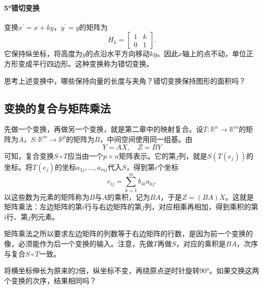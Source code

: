\paragraph{5°错切变换} \mbox{}

变换\(x^{\prime} = x + k y\)，\(y^{\prime} = y\)的矩阵为
\begin{equation}
    H_{k} = \left[ \begin{matrix}1 & k \\ 0 & 1\end{matrix} \right] .
\end{equation}
它保持纵坐标，将高度为\(y\)的点沿水平方向移动\(k y\)。因此\(x\)轴上的点不动，单位正方形变成平行四边形。这种变换称为错切变换。

{\kaiti{}思考\quad 上述变换中，哪些保持向量的长度与夹角？错切变换保持图形的面积吗？}

\subsection{变换的复合与矩阵乘法}
先做一个变换，再做另一个变换，就是第二章中的映射复合。设\(T : \mathbb{R}^{n} \longrightarrow \mathbb{R}^{m}\)的矩阵为\(A\)，\(S : \mathbb{R}^{m} \longrightarrow \mathbb{R}^{p}\)的矩阵为\(B\)，中间空间使用同一组基。由
\begin{equation}
    Y = A X , \quad Z = B Y
\end{equation}
可知，复合变换\(S \circ T\)应当由一个\(p \times n\)矩阵表示。它的第\(j\)列，就是\(S \left( T \left( e_{j} \right) \right)\)的坐标。将\(T \left( e_{j} \right)\)的坐标\(a_{1 j} , \ldots , a_{m j}\)代入\(S\)，得到第\(i\)个坐标
\begin{equation}
    c_{i j} = \sum_{k = 1}^{m} b_{i k} a_{k j} .
\end{equation}
以这些数为元素的矩阵称为\(B\)与\(A\)的乘积，记为\(B A\)，于是\(Z = \left( B A \right) X\)。这就是{\heiti{}矩阵乘法}：左边矩阵的第\(i\)行与右边矩阵的第\(j\)列，对应相乘再相加，得到乘积的第\(i\)行、第\(j\)列元素。

矩阵乘法之所以要求左边矩阵的列数等于右边矩阵的行数，是因为前一个变换的像，必须能作为后一个变换的输入。注意，先做\(T\)再做\(S\)，对应的乘积是\(B A\)，次序与复合\(S \circ T\)一致。

\begin{example}
将横坐标伸长为原来的\(2\)倍，纵坐标不变，再绕原点逆时针旋转90°。如果交换这两个变换的次序，结果相同吗？
\end{example}

